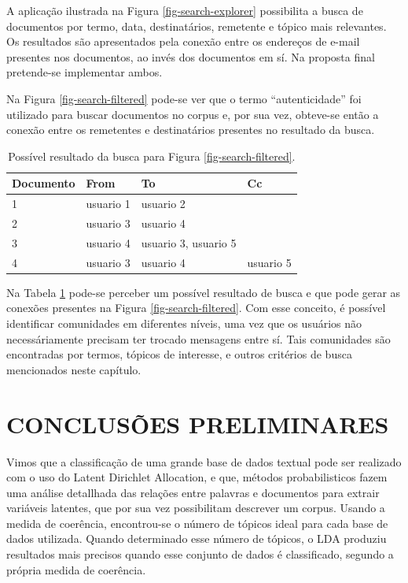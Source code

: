 \documentclass[12pt,a4paper]{article}
\begin{document}
A aplicação ilustrada na Figura \ref{fig-search-explorer} possibilita a busca de documentos por termo, data,
 destinatários, remetente e tópico mais relevantes. Os resultados são apresentados pela conexão entre os
 endereços de e-mail presentes nos documentos, ao invés dos documentos em sí. Na proposta final pretende-se implementar ambos.

Na Figura \ref{fig-search-filtered} pode-se ver que o termo ``autenticidade'' foi utilizado para buscar documentos no corpus e, por sua vez,
 obteve-se então a conexão entre os remetentes e destinatários presentes no resultado da busca.

\begin{table}[H]
  \centering
  \begin{tabular}{llll}
  Documento     & From                       & To                         & Cc         \\
  \hline
  1             & usuario 1                  & usuario 2                  &            \\
  2             & usuario 3                  & usuario 4                  &            \\
  3             & usuario 4                  & usuario 3, usuario 5       &             \\
  4             & usuario 3                  & usuario 4                  & usuario 5             \\
  \hline
  \end{tabular}
  \caption{Possível resultado da busca para Figura \ref{fig-search-filtered}.}
  \label{tab-nich-documents3}
\end{table}

Na Tabela  \ref{tab-nich-documents3} pode-se perceber um possível resultado de busca e que pode gerar as conexões presentes na Figura \ref{fig-search-filtered}.
 Com esse conceito, é possível identificar comunidades em diferentes níveis, uma vez que os usuários não necessáriamente precisam ter trocado mensagens entre sí. Tais 
 comunidades são encontradas por termos, tópicos de interesse, e outros critérios de busca mencionados neste capítulo.

\section{CONCLUSÕES PRELIMINARES} \label{sec:conclusoes-preliminares}

Vimos que a classificação de uma grande base de dados textual pode ser realizado com o uso do Latent Dirichlet Allocation, e que,
 métodos probabilisticos fazem uma análise detallhada das relações entre palavras e documentos para extrair variáveis
 latentes, que por sua vez possibilitam descrever um corpus. Usando a medida de coerência, encontrou-se
 o número de tópicos ideal para cada base de dados utilizada. Quando determinado esse número de tópicos, 
 o LDA produziu resultados mais precisos quando esse conjunto de dados é classificado, segundo a própria medida de coerência.
\end{document}
